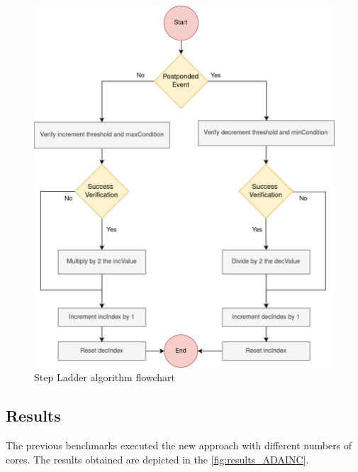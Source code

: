 \begin{figure}[H]
	\centering
 	\includegraphics[width=0.6\linewidth]{Images/incAlgorithm_flowchart.png}
 	\caption{Step Ladder algorithm flowchart}
	 \label{fig_incAlgorithm_flowchart}
\end{figure}

\subsection{Results}

The previous benchmarks executed the new approach with different numbers of cores. The results obtained are depicted in the 
\autoref{fig:results_ADAINC}. 

